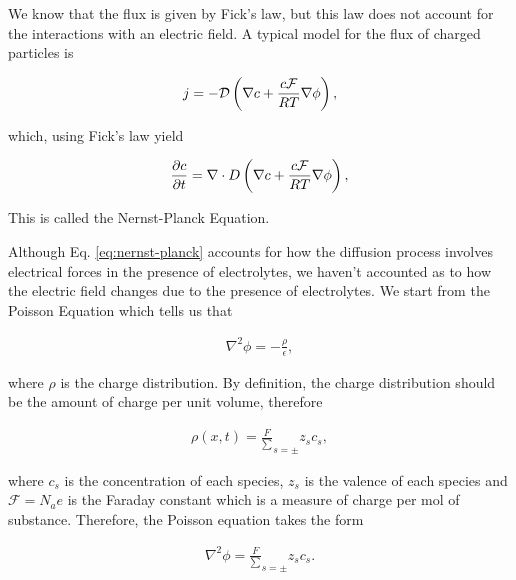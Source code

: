 We know that the flux is given by Fick's law, but this law does not account for the interactions with an electric field. A typical model for the flux of charged particles is

\begin{align}
	j= -\mathcal{D}\left({\nabla c + \frac{c \mathcal{F}}{RT}\nabla \phi}\right),
\end{align}

which, using Fick's law yield


\begin{align}
\label{eq:nernst-planck}
	\frac{\partial c}{\partial t}= \nabla \cdot D\left({\nabla c + \frac{c \mathcal{F}}{RT}\nabla \phi}\right),
\end{align}


This is called the Nernst-Planck Equation.

Although Eq. \ref{eq:nernst-planck} accounts for how the diffusion process involves electrical forces in the presence of electrolytes, we haven't accounted as to how the electric field changes due to the presence of electrolytes. 
We start from the Poisson Equation which tells us that

\begin{align}
	\nabla^2 \phi = -\frac{\rho}{\epsilon},
\end{align}

where $\rho$ is the charge distribution. By definition, the charge distribution should be the amount of charge per unit volume, therefore

\begin{align}
	\rho(x,t) = \frac{F}\sum_{s=\pm} z_sc_s,
\end{align}

where $c_s$ is the concentration of each species, $z_s$ is the valence of each species and $\mathcal{F} = N_ae$ is the Faraday constant which is a measure of charge per mol of substance. Therefore, the Poisson equation takes the form

\begin{align}
	\label{eq:poisson-electrolyte}
	\nabla^2 \phi = \frac{F}\sum_{s=\pm} z_sc_s.
\end{align}














